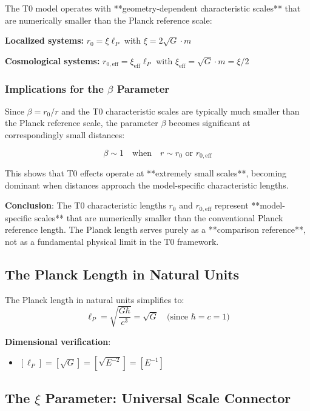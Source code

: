 \documentclass[12pt,a4paper]{article}
\begin{document}
The T0 model operates with **geometry-dependent characteristic scales** that are numerically smaller than the Planck reference scale:

\textbf{Localized systems:} $r_0 = \xi \ell_P$ with $\xi = 2\sqrt{G} \cdot m$

\textbf{Cosmological systems:} $r_{0,\text{eff}} = \xi_{\text{eff}} \ell_P$ with $\xi_{\text{eff}} = \sqrt{G} \cdot m = \xi/2$

\subsubsection{Implications for the $\beta$ Parameter}
\label{subsubsec:beta_implications}

Since $\beta = r_0/r$ and the T0 characteristic scales are typically much smaller than the Planck reference scale, the parameter $\beta$ becomes significant at correspondingly small distances:

\begin{equation}
	\beta \sim 1 \quad \text{when} \quad r \sim r_0 \text{ or } r_{0,\text{eff}}
\end{equation}

This shows that T0 effects operate at **extremely small scales**, becoming dominant when distances approach the model-specific characteristic lengths.

\textbf{Conclusion}: The T0 characteristic lengths $r_0$ and $r_{0,\text{eff}}$ represent **model-specific scales** that are numerically smaller than the conventional Planck reference length. The Planck length serves purely as a **comparison reference**, not as a fundamental physical limit in the T0 framework.
\subsection{The Planck Length in Natural Units}
\label{subsec:planck_length_natural}

The Planck length in natural units simplifies to:
\begin{equation}
	\ell_P = \sqrt{\frac{G\hbar}{c^3}} = \sqrt{G} \quad \text{(since } \hbar = c = 1\text{)}
\end{equation}

\textbf{Dimensional verification}:
\begin{itemize}
	\item $[\ell_P] = [\sqrt{G}] = [\sqrt{E^{-2}}] = [E^{-1}]$ \checkmark
\end{itemize}

\subsection{The $\xi$ Parameter: Universal Scale Connector}
\label{subsec:xi_universal_connector}
\end{document}
